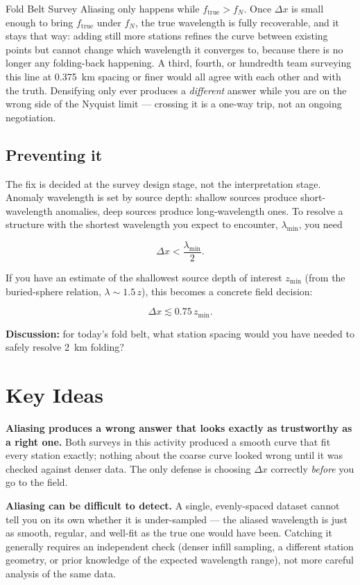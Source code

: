 \begin{activity}{Fold Belt Survey}
Aliasing only happens while $f_{\text{true}} > f_N$. Once $\Delta x$ is small enough to bring $f_{\text{true}}$ under $f_N$, the true wavelength is fully recoverable, and it stays that way: adding still more stations refines the curve between existing points but cannot change which wavelength it converges to, because there is no longer any folding-back happening. A third, fourth, or hundredth team surveying this line at \SI{0.375}{km} spacing or finer would all agree with each other and with the truth. Densifying only ever produces a \emph{different} answer while you are on the wrong side of the Nyquist limit --- crossing it is a one-way trip, not an ongoing negotiation.

\subsection*{Preventing it}

The fix is decided at the survey design stage, not the interpretation stage. Anomaly wavelength is set by source depth: shallow sources produce short-wavelength anomalies, deep sources produce long-wavelength ones. To resolve a structure with the shortest wavelength you expect to encounter, $\lambda_{\min}$, you need

$$\Delta x < \frac{\lambda_{\min}}{2}.$$

If you have an estimate of the shallowest source depth of interest $z_{\min}$ (from the buried-sphere relation, $\lambda \sim 1.5\,z$), this becomes a concrete field decision:

$$\Delta x \lesssim 0.75\, z_{\min}.$$

\textbf{Discussion:} for today's fold belt, what station spacing would you have needed to safely resolve \SI{2}{km} folding?

\answerbox[2.5cm]

\section*{Key Ideas}

\textbf{Aliasing produces a wrong answer that looks exactly as trustworthy as a right one.} Both surveys in this activity produced a smooth curve that fit every station exactly; nothing about the coarse curve looked wrong until it was checked against denser data. The only defense is choosing $\Delta x$ correctly \emph{before} you go to the field.

\textbf{Aliasing can be difficult to detect.} A single, evenly-spaced dataset cannot tell you on its own whether it is under-sampled --- the aliased wavelength is just as smooth, regular, and well-fit as the true one would have been. Catching it generally requires an independent check (denser infill sampling, a different station geometry, or prior knowledge of the expected wavelength range), not more careful analysis of the same data.


\end{activity}
